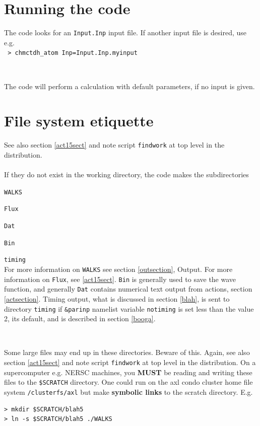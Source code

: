\documentclass[10pt,leqno, oneside]{book}
\begin{document}
\section{Running the code}

The code looks for an \verb#Input.Inp# input file.  If another input file is desired, use e.g. \\
\verb# > chmctdh_atom Inp=Input.Inp.myinput#

\

The code will perform a calculation with default parameters, if no input is given.

\section{File system etiquette\label{etsection}}

See also section \ref{act15sect} and note script \verb#findwork# at top level in the distribution.
\ \\ 
\ \\
If they do not exist in the working directory, the code makes the subdirectories 

\verb#WALKS#

\verb#Flux#

\verb#Dat#

\verb#Bin#

\verb#timing# \\
For more information on \verb#WALKS# see section \ref{outsection}, Output.  For more information on
\verb#Flux#, see  \ref{act15sect}.  \verb#Bin# is generally used to save the wave function, and generally \verb#Dat# contains
numerical text output from actions, section \ref{actsection}.  Timing output, what is discussed in section \ref{blah},
 is sent to directory \verb#timing# if \verb#&parinp# namelist variable \verb#notiming# is set less than the value 2,
 its default, and is described in section \ref{booga}.
 
 \
 
Some large files may end up in these directories.  Beware of this.  Again, 
see also section \ref{act15sect} and note script \verb#findwork# at top level in the distribution.
On a supercomputer e.g. NERSC machines, you \textbf{MUST} be reading and writing these files to the \verb#$SCRATCH# directory.  
One could run on the axl condo cluster home file system \verb#/clusterfs/axl# 
but make \textbf{symbolic links} to the scratch directory.  E.g.
\begin{verbatim}
> mkdir $SCRATCH/blah5
> ln -s $SCRATCH/blah5 ./WALKS
\end{verbatim}
\end{document}

